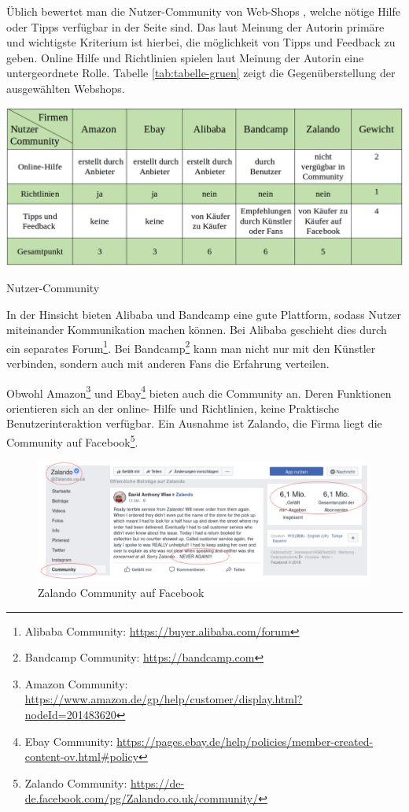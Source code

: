 Üblich bewertet man die Nutzer-Community von Web-Shops , welche nötige Hilfe oder Tipps verfügbar in der Seite sind. Das laut Meinung der Autorin primäre und wichtigste Kriterium ist hierbei, die möglichkeit von Tipps und Feedback zu geben. Online Hilfe und Richtlinien spielen laut Meinung der Autorin eine untergeordnete Rolle. Tabelle \vref{tab:tabelle-gruen} zeigt die Gegenüberstellung der ausgewählten Webshops.

\begin{table}[htbp]
	\centering
	\includegraphics[width=1\textwidth]{bilder/tabelle-gruen.png}
	\caption{Nutzer-Community}
	\label{tab:tabelle-gruen}
\end{table}

In der Hinsicht bieten Alibaba und Bandcamp eine gute Plattform, sodass Nutzer miteinander Kommunikation machen können. Bei Alibaba geschieht dies durch ein separates Forum\footnote{Alibaba Community: \url{https://buyer.alibaba.com/forum}}. Bei Bandcamp\footnote{ Bandcamp Community: \url{https://bandcamp.com}} kann man nicht nur mit den Künstler verbinden, sondern auch mit anderen Fans die Erfahrung verteilen.

Obwohl Amazon\footnote{Amazon Community: \url{https://www.amazon.de/gp/help/customer/display.html?nodeId=201483620}} und Ebay\footnote{Ebay Community: \url{https://pages.ebay.de/help/policies/member-created-content-ov.html\#policy}} bieten auch die Community an. Deren Funktionen orientieren sich an der online- Hilfe und Richtlinien, keine Praktische Benutzerinteraktion verfügbar. Ein Ausnahme ist Zalando, die Firma liegt die Community auf Facebook\footnote{Zalando Community: \url{https://de-de.facebook.com/pg/Zalando.co.uk/community/}}.

\begin{figure}
	\centering
	\includegraphics[width=1\textwidth]{bilder/zalando-community.png}
	\caption{Zalando Community auf Facebook}
	\label{fig:zalando-community}
\end{figure}

